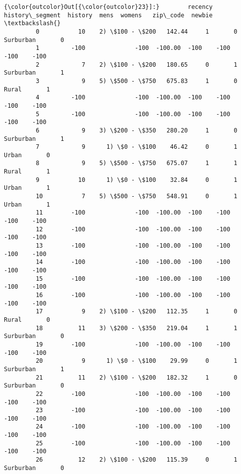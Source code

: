 \documentclass[11pt]{article}
\begin{document}
\begin{Verbatim}[commandchars=\\\{\}]
{\color{outcolor}Out[{\color{outcolor}23}]:}        recency   history\_segment  history  mens  womens   zip\_code  newbie  \textbackslash{}
         0           10    2) \$100 - \$200   142.44     1       0  Surburban       0   
         1         -100              -100  -100.00  -100    -100       -100    -100   
         2            7    2) \$100 - \$200   180.65     0       1  Surburban       1   
         3            9    5) \$500 - \$750   675.83     1       0      Rural       1   
         4         -100              -100  -100.00  -100    -100       -100    -100   
         5         -100              -100  -100.00  -100    -100       -100    -100   
         6            9    3) \$200 - \$350   280.20     1       0  Surburban       1   
         7            9      1) \$0 - \$100    46.42     0       1      Urban       0   
         8            9    5) \$500 - \$750   675.07     1       1      Rural       1   
         9           10      1) \$0 - \$100    32.84     0       1      Urban       1   
         10           7    5) \$500 - \$750   548.91     0       1      Urban       1   
         11        -100              -100  -100.00  -100    -100       -100    -100   
         12        -100              -100  -100.00  -100    -100       -100    -100   
         13        -100              -100  -100.00  -100    -100       -100    -100   
         14        -100              -100  -100.00  -100    -100       -100    -100   
         15        -100              -100  -100.00  -100    -100       -100    -100   
         16        -100              -100  -100.00  -100    -100       -100    -100   
         17           9    2) \$100 - \$200   112.35     1       0      Rural       0   
         18          11    3) \$200 - \$350   219.04     1       1  Surburban       0   
         19        -100              -100  -100.00  -100    -100       -100    -100   
         20           9      1) \$0 - \$100    29.99     0       1  Surburban       1   
         21          11    2) \$100 - \$200   182.32     1       0  Surburban       0   
         22        -100              -100  -100.00  -100    -100       -100    -100   
         23        -100              -100  -100.00  -100    -100       -100    -100   
         24        -100              -100  -100.00  -100    -100       -100    -100   
         25        -100              -100  -100.00  -100    -100       -100    -100   
         26          12    2) \$100 - \$200   115.39     0       1  Surburban       0   

\end{Verbatim}
\end{document}
